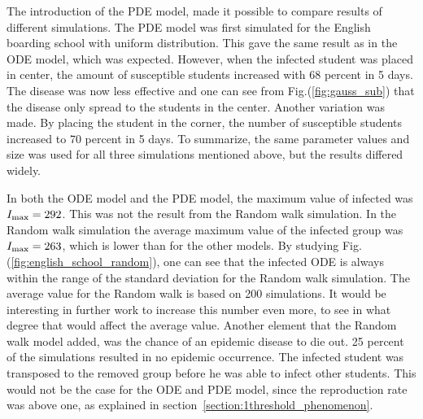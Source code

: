 \documentclass[%
twoside,                 %
final,                   %
chapterprefix=true,      %
open=right               %
10pt]{book}
\begin{document}
\vspace{3mm}




\vspace{3mm}


The introduction of the PDE model, made it possible to compare results of different simulations. The PDE model was first simulated for the English boarding school with uniform distribution. This gave the same result as in the ODE model, which was expected. However, when the infected student was placed in center, the amount of susceptible students increased with 68 percent in 5 days. The disease was now less effective and one can see from Fig.(\ref{fig:gauss_sub}) that the disease only spread to the students in the center. Another variation was made. By placing the student in the corner, the number of susceptible students increased to 70 percent in 5 days. To summarize, the same parameter values and size was used for all three simulations mentioned above, but the results differed widely. 


\vspace{3mm}




\vspace{3mm}


In both the ODE model and the PDE model, the maximum value of infected was $I_{\textrm{max}}=292$. This was not the result from the Random walk simulation. In the Random walk simulation the average maximum value of the infected group was $I_{\textrm{max}}=263$, which is lower than for the other models. By studying Fig.(\ref{fig:english_school_random}), one can see that the infected ODE is always within the range of the standard deviation for the Random walk simulation. The average value for the Random walk is based on 200 simulations. It would be interesting in further work to increase this number even more, to see in what degree that would affect the average value. Another element that the Random walk model added, was the chance of an epidemic disease to die out. 25 percent of the simulations resulted in no epidemic occurrence. The infected student was transposed to the removed group before he was able to infect other students. This would not be the case for the ODE and PDE model, since the reproduction rate was above one, as explained in section~\ref{section:1threshold_phenomenon}.  


\vspace{3mm}




\vspace{3mm}
\end{document}
